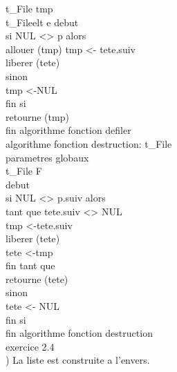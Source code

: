 \documentclass [11pt]{report}
\begin{document}
\indent \indent 				t\_File tmp\\
\indent \indent					t\_Fileelt e
\indent 				debut \\
\indent \indent 			si NUL <> p alors\\
\indent \indent \indent 		allouer (tmp)
\indent \indent \indent 		tmp <- tete\textuparrow.suiv \\
\indent \indent \indent 		
\indent \indent \indent 		liberer (tete)\\
\indent \indent 			sinon\\
\indent \indent \indent 		tmp <-NUL\\
\indent\indent 				fin si\\
\indent \indent 			retourne (tmp)\\
\indent 				fin algorithme fonction defiler\\

\indent algorithme fonction destruction: t\_File\\
\indent \indent  parametres globaux\\
\indent \indent \indent t\_File F\\
\indent debut \\
\indent \indent si NUL <> p\textuparrow.suiv alors\\
\indent \indent \indent tant que tete\textuparrow.suiv <> NUL \\
\indent \indent \indent \indent tmp <-tete\textuparrow.suiv \\
\indent \indent \indent \indent liberer (tete)\\
\indent \indent \indent \indent tete <-tmp\\
\indent \indent \indent fin tant que \\
\indent \indent \indent retourne (tete)\\
\indent \indent sinon\\
\indent \indent \indent tete <- NUL\\
\indent \indent fin si\\
\indent fin algorithme fonction destruction\\
\newpage
exercice 2.4\\
) La liste est construite a l'envers.\\
\end{document}
